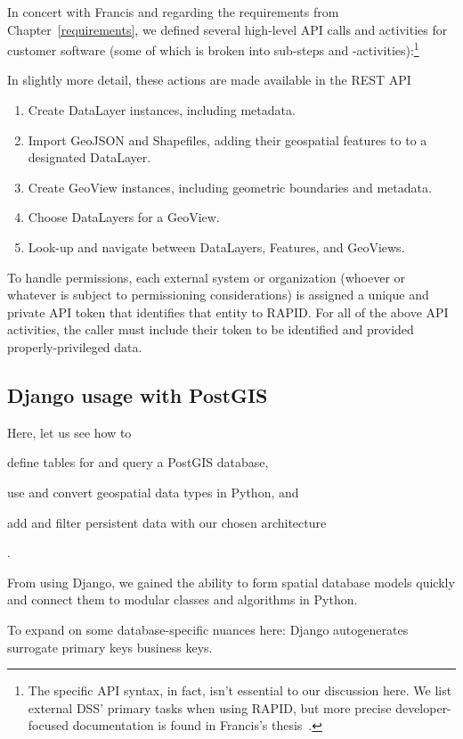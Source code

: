 In concert with Francis and regarding the requirements from Chapter~\ref{requirements}, we defined several high-level API calls and activities for customer software (some of which is broken into sub-steps and -activities):\footnote{The specific API syntax, in fact, isn't essential to our discussion here. We list external DSS' primary tasks when using RAPID, but more precise developer-focused documentation is found in Francis's thesis~\cite{Francis}.}

In slightly more detail, these actions are made available in the REST API

\begin{enumerate}
  \item Create DataLayer instances, including metadata.
  \item Import GeoJSON and Shapefiles, adding their geospatial features to to a designated DataLayer.
  \item Create GeoView instances, including geometric boundaries and metadata.
  \item Choose DataLayers for a GeoView.
  \item Look-up and navigate between DataLayers, Features, and GeoViews.
\end{enumerate}

To handle permissions, each external system or organization (whoever or whatever is subject to permissioning considerations) is assigned a unique and private API token that identifies that entity to RAPID. For all of the above API activities, the caller must include their token to be identified and provided properly-privileged data.

\subsection{Django usage with PostGIS}
Here, let us see how to
\begin{enumerate*}[label=\itshape\alph*\upshape)]
\item define tables for and query a PostGIS database,
\item use and convert geospatial data types in Python, and
\item add and filter persistent data with our chosen architecture
\end{enumerate*}.

From using Django, we gained the ability to form spatial database models quickly and connect them to modular classes and algorithms in Python.

To expand on some database-specific nuances here: Django autogenerates surrogate primary keys business keys.


